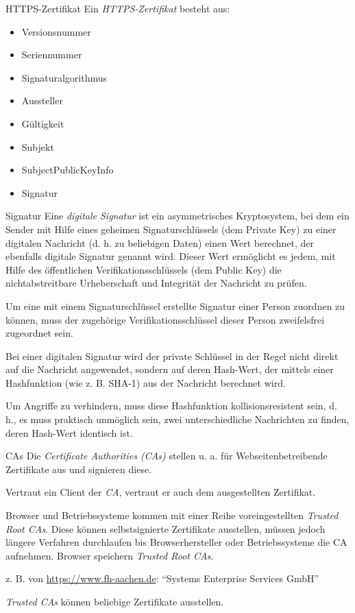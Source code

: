 \begin{defi}{HTTPS-Zertifikat}
    Ein \emph{HTTPS-Zertifikat} besteht aus:
    \begin{itemize}
        \item Versionsnummer
        \item Seriennummer
        \item Signaturalgorithmus
        \item Aussteller
        \item Gültigkeit
        \item Subjekt
        \item SubjectPublicKeyInfo
        \item Signatur
    \end{itemize}
\end{defi}

\begin{defi}{Signatur}
    Eine \emph{digitale Signatur} ist ein asymmetrisches Kryptosystem, bei dem ein Sender mit Hilfe eines geheimen Signaturschlüssels (dem Private Key) zu einer digitalen Nachricht (d. h. zu beliebigen Daten) einen Wert berechnet, der ebenfalls digitale Signatur genannt wird.
    Dieser Wert ermöglicht es jedem, mit Hilfe des öffentlichen Verifikationsschlüssels (dem Public Key) die nichtabstreitbare Urheberschaft und Integrität der Nachricht zu prüfen.

    Um eine mit einem Signaturschlüssel erstellte Signatur einer Person zuordnen zu können, muss der zugehörige Verifikationsschlüssel dieser Person zweifelsfrei zugeordnet sein.

    Bei einer digitalen Signatur wird der private Schlüssel in der Regel nicht direkt auf die Nachricht angewendet, sondern auf deren Hash-Wert, der mittels einer Hashfunktion (wie z. B. SHA-1) aus der Nachricht berechnet wird.

    Um Angriffe zu verhindern, muss diese Hashfunktion kollisionsresistent sein, d. h., es muss praktisch unmöglich sein, zwei unterschiedliche Nachrichten zu finden, deren Hash-Wert identisch ist.
\end{defi}

\begin{bonus}{CAs}
    Die \emph{Certificate Authorities (CAs)} stellen u. a. für Webseitenbetreibende Zertifikate aus und signieren diese.

    Vertraut ein Client der \emph{CA}, vertraut er auch dem ausgestellten Zertifikat.

    Browser und Betriebssysteme kommen mit einer Reihe voreingestellten \emph{Trusted Root CAs}.
    Diese können selbstsignierte Zertifikate ausstellen, müssen jedoch längere Verfahren durchlaufen bis Browserhersteller oder Betriebssysteme die CA aufnehmen.
    Browser speichern \emph{Trusted Root CAs}.

    z. B. von \href{https://www.fh-aachen.de}{https://www.fh-aachen.de}: \enquote{Systems Enterprise Services GmbH}

    \emph{Trusted CAs} können beliebige Zertifikate ausstellen.
\end{bonus}

